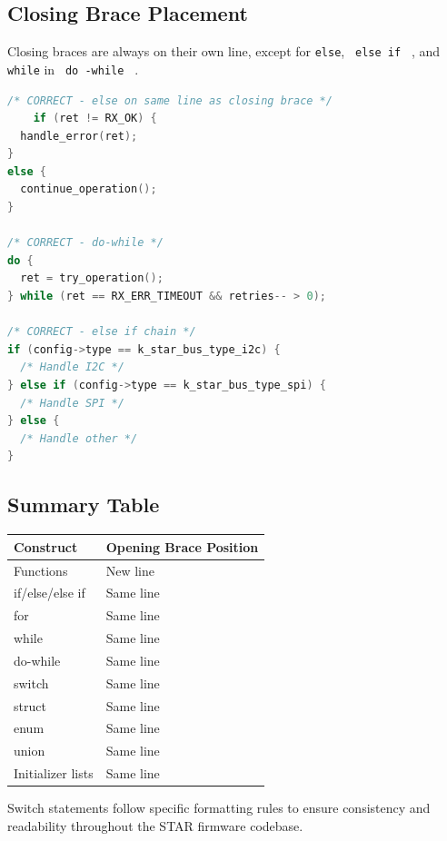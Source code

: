 \subsection{Closing Brace Placement}

Closing braces are always on their own line, except for \texttt{else}, \texttt{
  else if
}
, and \texttt { while}
in \texttt {
  do
    -while
}
.

\begin{lstlisting}[language = C]
    /* CORRECT - else on same line as closing brace */
    if (ret != RX_OK) {
  handle_error(ret);
}
else {
  continue_operation();
}

/* CORRECT - do-while */
do {
  ret = try_operation();
} while (ret == RX_ERR_TIMEOUT && retries-- > 0);

/* CORRECT - else if chain */
if (config->type == k_star_bus_type_i2c) {
  /* Handle I2C */
} else if (config->type == k_star_bus_type_spi) {
  /* Handle SPI */
} else {
  /* Handle other */
}
\end{lstlisting}

\subsection{Summary Table}

\begin{center}
\begin{tabular} { | l | l |}
\hline
\textbf{Construct} & \textbf{Opening Brace Position} \\
\hline
Functions & New line \\
\hline
if/else/else if & Same line \\
\hline
for & Same line \\
\hline
while & Same line \\
\hline
do-while & Same line \\
\hline
switch & Same line \\
\hline
struct & Same line \\
\hline
enum & Same line \\
\hline
union & Same line \\
\hline
Initializer lists & Same line \\
\hline
\end{tabular}
\end{center}

Switch statements follow specific formatting rules to
    ensure consistency and readability throughout the STAR firmware codebase.

